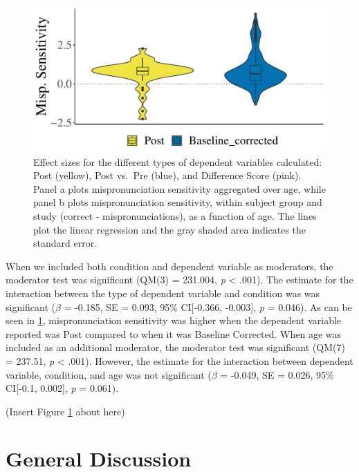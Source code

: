 \documentclass[
  english,
  man, noextraspace]{apa6}
\begin{document}
\begin{figure}
\centering
\includegraphics{VonHolzenBergmann_MPMetaAnalysis_files/figure-latex/PlotWithinCondDVbaseline-1.pdf}
\caption{\label{fig:PlotWithinCondDVbaseline}Effect sizes for the different types of dependent variables calculated: Post (yellow), Post vs.~Pre (blue), and Difference Score (pink). Panel a plots mispronunciation sensitivity aggregated over age, while panel b plots mispronunciation sensitivity, within subject group and study (correct - mispronunciations), as a function of age. The lines plot the linear regression and the gray shaded area indicates the standard error.}
\end{figure}

When we included both condition and dependent variable as moderators, the moderator test was significant (QM(3) = 231.004, \emph{p} \textless{} .001). The estimate for the interaction between the type of dependent variable and condition was was significant (\(\beta\) = -0.185, SE = 0.093, 95\% CI{[}-0.366, -0.003{]}, \emph{p} = 0.046). As can be seen in \ref{fig:PlotWithinCondDVbaseline}, mispronunciation sensitivity was higher when the dependent variable reported was Post compared to when it was Baseline Corrected. When age was included as an additional moderator, the moderator test was significant (QM(7) = 237.51, \emph{p} \textless{} .001). However, the estimate for the interaction between dependent variable, condition, and age was not significant (\(\beta\) = -0.049, SE = 0.026, 95\% CI{[}-0.1, 0.002{]}, \emph{p} = 0.061).

(Insert Figure \ref{fig:PlotWithinCondDVbaseline} about here)

\hypertarget{general-discussion}{%
\section{General Discussion}\label{general-discussion}}
\end{document}
